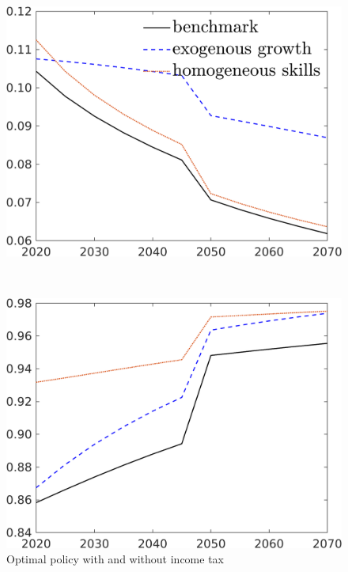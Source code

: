 \begin{figure}[h!!]
	\centering
	\caption{Optimal policy with and without income tax }\label{fig:comp_mod}
	
	\begin{minipage}[]{0.4\textwidth}
		\includegraphics[width=1\textwidth]{../../codding_model/own_basedOnFried/optimalPol_190722_tidiedUp/figures/all_10Aout22/CompMod1_OPT_T_NoTaus_taul_regime3_spillover0_noskill0_sep1_xgrowth0_extern0_etaa0.79_lgd1.png}
	\end{minipage}
\begin{minipage}[]{0.1\textwidth}
	\
\end{minipage}
\begin{minipage}[]{0.4\textwidth}
	\includegraphics[width=1\textwidth]{../../codding_model/own_basedOnFried/optimalPol_190722_tidiedUp/figures/all_10Aout22/CompMod1_OPT_T_NoTaus_tauf_regime3_spillover0_noskill0_sep1_xgrowth0_extern0_etaa0.79_lgd0.png}
\end{minipage}
\end{figure}


